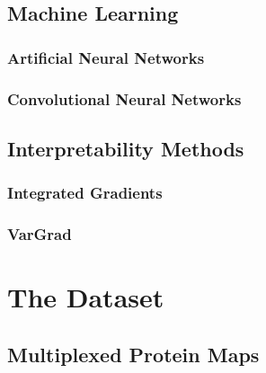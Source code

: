 \documentclass[biblatexBackend=bibtex]{tumthesis}
\begin{document}
\section{Machine Learning}

\label{sec:basics:ML}
\subsection{Artificial Neural Networks}

\label{sec:basics:ANN}

\subsection{Convolutional Neural Networks}
\label{sec:basics:CNN}


\section{Interpretability Methods}
\label{sec:basics:interpretability_methods}


\subsection{Integrated Gradients}
\label{sec:basics:IG}


\subsection{VarGrad}
\label{sec:basics:VarGrad}



\chapter{The Dataset}
\label{ch:dataset}


\section{Multiplexed Protein Maps}
\label{sec:dataset:multiplexed_protein_maps}

\end{document}
